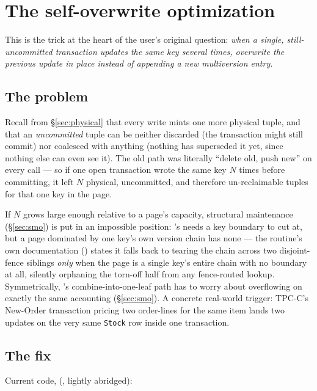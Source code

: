 \documentclass[11pt]{article}
\begin{document}
\section{The self-overwrite optimization}
\label{sec:selfoverwrite}

This is the trick at the heart of the user's original question: \emph{when a single,
still-uncommitted transaction updates the same key several times, overwrite the previous
update in place instead of appending a new multiversion entry.}

\subsection{The problem}

Recall from \S\ref{sec:physical} that every write mints one more physical
 tuple, and that an \emph{uncommitted} tuple can be neither discarded
(the transaction might still commit) nor coalesced with anything (nothing has superseded
it yet, since nothing else can even see it). The old  path
was literally ``delete old, push new'' on every call --- so if one open transaction wrote
the same key $N$ times before committing, it left $N$ physical, uncommitted, and
therefore un-reclaimable tuples for that one key in the page.

If $N$ grows large enough relative to a page's capacity, structural maintenance
(\S\ref{sec:smo}) is put in an impossible position: 's
 needs a key boundary to cut at, but a page dominated by one
key's own version chain has none --- the routine's own documentation
() states it falls back to tearing the chain across two disjoint-fence
siblings \emph{only} when the page is a single key's entire chain with no boundary at
all, silently orphaning the torn-off half from any fence-routed lookup. Symmetrically,
's combine-into-one-leaf path has to worry about overflowing
 on exactly the same accounting (\S\ref{sec:smo}). A concrete real-world
trigger: TPC-C's New-Order transaction pricing two order-lines for the same item lands
two updates on the very same \texttt{Stock} row inside one transaction.

\subsection{The fix}

Current code,  (,
lightly abridged):
\end{document}
